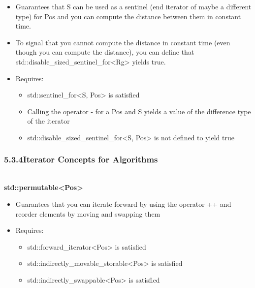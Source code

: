 \begin{itemize}
\item
Guarantees that S can be used as a sentinel (end iterator of maybe a different type) for Pos and you can compute the distance between them in constant time.

\item
To signal that you cannot compute the distance in constant time (even though you can compute the distance), you can define that std::disable\_sized\_sentinel\_for<Rg> yields true.

\item
Requires:
\begin{itemize}
\item
std::sentinel\_for<S, Pos> is satisfied

\item
Calling the operator - for a Pos and S yields a value of the difference type of the iterator

\item
std::disable\_sized\_sentinel\_for<S, Pos> is not defined to yield true
\end{itemize}
\end{itemize}


\subsubsection*{ 5.3.4\hspace{0.2cm}Iterator Concepts for Algorithms}


\noindent
\hspace*{\fill} \\ %
\textbf{std::permutable<Pos>}

\begin{itemize}
\item
Guarantees that you can iterate forward by using the operator ++ and reorder elements by moving and swapping them

\item
Requires:
\begin{itemize}
\item
std::forward\_iterator<Pos> is satisfied

\item
std::indirectly\_movable\_storable<Pos> is satisfied

\item
std::indirectly\_swappable<Pos> is satisfied
\end{itemize}
\end{itemize}


